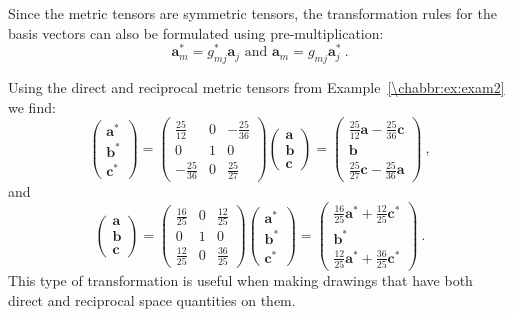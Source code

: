 Since the metric tensors are symmetric tensors, the transformation rules for the basis vectors can also be formulated using pre-multiplication:
\begin{equation}
	\mathbf{a}^{\ast}_m = g^{\ast}_{mj} \mathbf{a}_j\text{ and } \mathbf{a}_m = g_{mj}\mathbf{a}^{\ast}_j\ .\label{\chabbr:eq:basistrafo}
\end{equation}

\noindent Using the direct and reciprocal metric tensors from Example~\ref{\chabbr:ex:exam2} we find:
\[
	\begin{pmatrix}\mathbf{a}^{\ast}\\ \mathbf{b}^{\ast}\\ \mathbf{c}^{\ast}\end{pmatrix}=
	\begin{pmatrix}\frac{25}{12} & 0 & -\frac{25}{36}\\ 0 & 1 & 0\\ -\frac{25}{36} & 0 & \frac{25}{27}\end{pmatrix}
	\begin{pmatrix}\mathbf{a}\\ \mathbf{b}\\ \mathbf{c}\end{pmatrix} = \begin{pmatrix}\frac{25}{12}\mathbf{a}-\frac{25}{36}\mathbf{c}\\ \mathbf{b}\\ \frac{25}{27}\mathbf{c}-\frac{25}{36}\mathbf{a}\end{pmatrix}\ ,
\]
and
\[
	\begin{pmatrix}\mathbf{a}\\ \mathbf{b}\\ \mathbf{c}\end{pmatrix}=
	\begin{pmatrix}\frac{16}{25} & 0 & \frac{12}{25}\\ 0 & 1 & 0\\ \frac{12}{25} & 0 & \frac{36}{25}\end{pmatrix}
	\begin{pmatrix}\mathbf{a}^{\ast}\\ \mathbf{b}^{\ast}\\ \mathbf{c}^{\ast}\end{pmatrix} = \begin{pmatrix}\frac{16}{25}\mathbf{a}^{\ast}+\frac{12}{25}\mathbf{c}^{\ast}\\ \mathbf{b}^{\ast}\\ \frac{12}{25}\mathbf{a}^{\ast}+\frac{36}{25}\mathbf{c}^{\ast}\end{pmatrix}\ .
\]
This type of transformation is useful when making drawings that have both direct and reciprocal space quantities on them.


